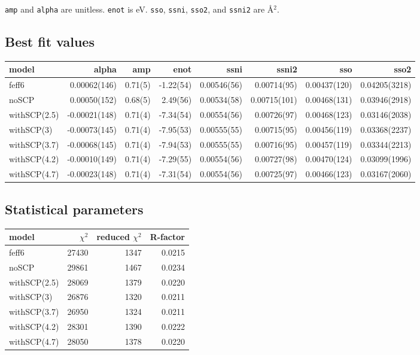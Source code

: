 \documentclass[11pt]{article}
\begin{document}
\texttt{amp} and \texttt{alpha} are unitless. \texttt{enot} is
eV. \texttt{sso}, \texttt{ssni}, \texttt{sso2}, and \texttt{ssni2} are
{\AA}$^2$.

\subsection{Best fit values}
\label{sec:orgheadline8}

\begin{center}
  \footnotesize
  \begin{tabular}{lrrrrrrr}
    model & alpha & amp & enot & ssni & ssni2 & sso & sso2\\
    \hline
    feff6        & 0.00062(146)  & 0.71(5) & -1.22(54) & 0.00546(56) & 0.00714(95) & 0.00437(120) & 0.04205(3218)\\
    noSCP        & 0.00050(152)  & 0.68(5) & 2.49(56)  & 0.00534(58) & 0.00715(101)& 0.00468(131) & 0.03946(2918)\\
    withSCP(2.5) & -0.00021(148) & 0.71(4) & -7.34(54) & 0.00554(56) & 0.00726(97) & 0.00468(123) & 0.03146(2038)\\
    withSCP(3)   & -0.00073(145) & 0.71(4) & -7.95(53) & 0.00555(55) & 0.00715(95) & 0.00456(119) & 0.03368(2237)\\
    withSCP(3.7) & -0.00068(145) & 0.71(4) & -7.94(53) & 0.00555(55) & 0.00716(95) & 0.00457(119) & 0.03344(2213)\\
    withSCP(4.2) & -0.00010(149) & 0.71(4) & -7.29(55) & 0.00554(56) & 0.00727(98) & 0.00470(124) & 0.03099(1996)\\
    withSCP(4.7) & -0.00023(148) & 0.71(4) & -7.31(54) & 0.00554(56) & 0.00725(97) & 0.00466(123) & 0.03167(2060)\\
  \end{tabular}
\end{center}

\subsection{Statistical parameters}
\label{sec:orgheadline9}

\begin{center}
  \begin{tabular}{lrrr}
    model & $\chi^2$ & reduced $\chi^2$ & R-factor\\
    \hline
    feff6        & 27430 & 1347 & 0.0215\\
    noSCP        & 29861 & 1467 & 0.0234\\
    withSCP(2.5) & 28069 & 1379 & 0.0220\\
    withSCP(3)   & 26876 & 1320 & 0.0211\\
    withSCP(3.7) & 26950 & 1324 & 0.0211\\
    withSCP(4.2) & 28301 & 1390 & 0.0222\\
    withSCP(4.7) & 28050 & 1378 & 0.0220\\
  \end{tabular}
\end{center}
\end{document}
